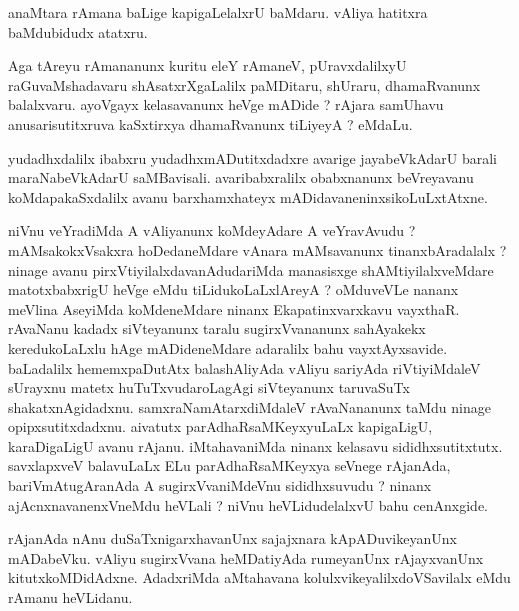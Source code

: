 \documentclass{article}
\begin{document}
\begin{mn}
anaMtara  rAmana  baLige  kapigaLelalxrU  baMdaru.  vAliya  hatitxra  baMdubidudx  atatxru.
\end{mn}

\begin{mn}
Aga  tAreyu  rAmananunx  kuritu  eleY  rAmaneV,  pUravxdalilxyU  raGuvaMshadavaru  shAsatxrXgaLalilx  paMDitaru,  shUraru,  dhamaRvanunx  
balalxvaru.  ayoVgayx kelasavanunx  heVge  mADide ?  rAjara  samUhavu  anusarisutitxruva  kaSxtirxya  dhamaRvanunx  tiLiyeyA ?  eMdaLu.
\end{mn}

\begin{mn}
yudadhxdalilx  ibabxru  yudadhxmADutitxdadxre  avarige  jayabeVkAdarU  barali  maraNabeVkAdarU  saMBavisali.  avaribabxralilx  obabxnanunx  
beVreyavanu  koMdapakaSxdalilx  avanu  barxhamxhateyx  mADidavaneninxsikoLuLxtAtxne.
\end{mn}

\begin{mn}
niVnu  veYradiMda  A  vAliyanunx  koMdeyAdare  A  veYravAvudu ?  mAMsakokxVsakxra  hoDedaneMdare  vAnara  mAMsavanunx  tinanxbAradalalx ?  
ninage  avanu  pirxVtiyilalxdavanAdudariMda  manasisxge  shAMtiyilalxveMdare  matotxbabxrigU  heVge  eMdu  tiLidukoLaLxlAreyA ?  oMduveVLe  
nananx  meVlina  AseyiMda  koMdeneMdare  ninanx  Ekapatinxvarxkavu  vayxthaR.  rAvaNanu  kadadx  siVteyanunx  taralu  sugirxVvananunx  
sahAyakekx  keredukoLaLxlu  hAge  mADideneMdare  adaralilx  bahu  vayxtAyxsavide.  baLadalilx  hememxpaDutAtx  balashAliyAda  vAliyu  
sariyAda  riVtiyiMdaleV  sUrayxnu  matetx  huTuTxvudaroLagAgi  siVteyanunx  taruvaSuTx  shakatxnAgidadxnu.  samxraNamAtarxdiMdaleV  
rAvaNananunx  taMdu  ninage  opipxsutitxdadxnu.  aivatutx  parAdhaRsaMKeyxyuLaLx  kapigaLigU,  karaDigaLigU  avanu  rAjanu.  iMtahavaniMda  
ninanx  kelasavu  sididhxsutitxtutx.  savxlapxveV  balavuLaLx  ELu  parAdhaRsaMKeyxya  seVnege  rAjanAda,  bariVmAtugAranAda  A  sugirxVvaniMdeVnu  
sididhxsuvudu ?  ninanx  ajAcnxnavanenxVneMdu  heVLali ?  niVnu  heVLidudelalxvU  bahu  cenAnxgide.
\end{mn}

\begin{mn}
rAjanAda  nAnu  duSaTxnigarxhavanUnx  sajajxnara  kApADuvikeyanUnx  mADabeVku.  vAliyu  sugirxVvana  heMDatiyAda  rumeyanUnx  
rAjayxvanUnx  kitutxkoMDidAdxne.  AdadxriMda  aMtahavana  kolulxvikeyalilxdoVSavilalx  eMdu  rAmanu  heVLidanu.
\end{mn}
\end{document}
